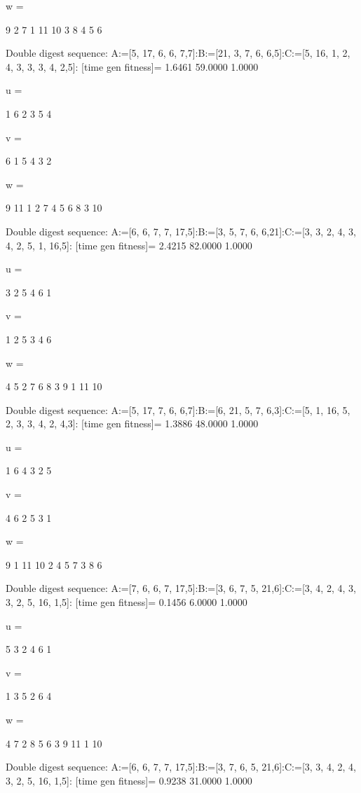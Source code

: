 w =

     9     2     7     1    11    10     3     8     4     5     6

Double digest sequence:
A:=[5, 17, 6, 6, 7,7]:B:=[21, 3, 7, 6, 6,5]:C:=[5, 16, 1, 2, 4, 3, 3, 3, 4, 2,5]:
[time gen fitness]=
    1.6461   59.0000    1.0000


u =

     1     6     2     3     5     4


v =

     6     1     5     4     3     2


w =

     9    11     1     2     7     4     5     6     8     3    10

Double digest sequence:
A:=[6, 6, 7, 7, 17,5]:B:=[3, 5, 7, 6, 6,21]:C:=[3, 3, 2, 4, 3, 4, 2, 5, 1, 16,5]:
[time gen fitness]=
    2.4215   82.0000    1.0000


u =

     3     2     5     4     6     1


v =

     1     2     5     3     4     6


w =

     4     5     2     7     6     8     3     9     1    11    10

Double digest sequence:
A:=[5, 17, 7, 6, 6,7]:B:=[6, 21, 5, 7, 6,3]:C:=[5, 1, 16, 5, 2, 3, 3, 4, 2, 4,3]:
[time gen fitness]=
    1.3886   48.0000    1.0000


u =

     1     6     4     3     2     5


v =

     4     6     2     5     3     1


w =

     9     1    11    10     2     4     5     7     3     8     6

Double digest sequence:
A:=[7, 6, 6, 7, 17,5]:B:=[3, 6, 7, 5, 21,6]:C:=[3, 4, 2, 4, 3, 3, 2, 5, 16, 1,5]:
[time gen fitness]=
    0.1456    6.0000    1.0000


u =

     5     3     2     4     6     1


v =

     1     3     5     2     6     4


w =

     4     7     2     8     5     6     3     9    11     1    10

Double digest sequence:
A:=[6, 6, 7, 7, 17,5]:B:=[3, 7, 6, 5, 21,6]:C:=[3, 3, 4, 2, 4, 3, 2, 5, 16, 1,5]:
[time gen fitness]=
    0.9238   31.0000    1.0000


